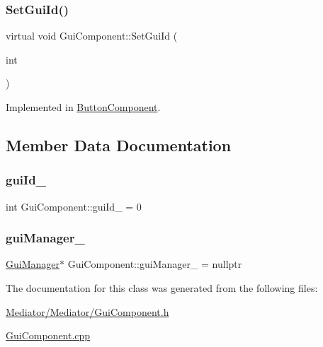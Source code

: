 \subsubsection{\texorpdfstring{SetGuiId()}{SetGuiId()}}
{\footnotesize\ttfamily virtual void Gui\+Component\+::\+Set\+Gui\+Id (\begin{DoxyParamCaption}\item[{int}]{ }\end{DoxyParamCaption})\hspace{0.3cm}{\ttfamily [pure virtual]}}



Implemented in \mbox{\hyperlink{class_button_component_a32986620f217bace2cbbd10fb73f34cd}{Button\+Component}}.



\subsection{Member Data Documentation}
\mbox{\label{class_gui_component_a8fb428ee8083cdaf7d1f9729a22bcf84}} 
\subsubsection{\texorpdfstring{guiId\_}{guiId\_}}
{\footnotesize\ttfamily int Gui\+Component\+::gui\+Id\+\_\+ = 0\hspace{0.3cm}{\ttfamily [protected]}}

\mbox{\label{class_gui_component_a96d148edf9f521cd048b98f749bdf2e5}} 
\subsubsection{\texorpdfstring{guiManager\_}{guiManager\_}}
{\footnotesize\ttfamily \mbox{\hyperlink{class_gui_manager}{Gui\+Manager}}$\ast$ Gui\+Component\+::gui\+Manager\+\_\+ = nullptr\hspace{0.3cm}{\ttfamily [protected]}}



The documentation for this class was generated from the following files\+:\begin{DoxyCompactItemize}
\item 
\mbox{\hyperlink{_mediator_2_mediator_2_gui_component_8h}{Mediator/\+Mediator/\+Gui\+Component.\+h}}\item 
\mbox{\hyperlink{_gui_component_8cpp}{Gui\+Component.\+cpp}}\end{DoxyCompactItemize}
